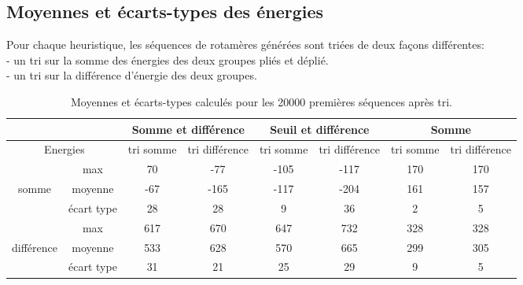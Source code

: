 \documentclass[a4paper,12pt]{article}
\begin{document}
\begin{sffamily}
\section{Moyennes et écarts-types des énergies}



Pour chaque heuristique, les séquences de rotamères générées sont triées de deux façons différentes:\\
- un tri sur la somme des énergies des deux groupes pliés et déplié.\\
- un tri sur la différence d'énergie des deux groupes.
 

    \begin{table}[!htbp]
      \centering
      \resizebox{18cm}{!} {
      \begin{tabular}{|c|c|c|c||c|c||c|c|}
        \hline
        \multicolumn{2}{|c|}{} &\multicolumn{2}{c||}{Somme et différence} & \multicolumn{2}{c||}{Seuil et différence} & \multicolumn{2}{c|}{Somme} \\ \hline

   \multicolumn{2}{|c|}{Energies} & tri somme & tri différence & tri somme & tri différence & tri somme & tri différence  \\ \hline    
              &  max       &  70    &    -77         &   -105   &    -117         &  170       & 170             \\ \cline{2-8}         
   somme      & moyenne    & -67    &    -165        &   -117   &    -204         &  161       & 157             \\ \cline{2-8}      
              & écart type &  28    &    28          &    9     &     36          &   2        &  5              \\ \hline 
              & max        &  617   &    670         &    647   &     732         &   328      & 328             \\ \cline{2-8}         
   différence & moyenne    &  533   &    628         &    570   &     665         &   299      & 305             \\ \cline{2-8}      
              & écart type &  31    &    21          &    25    &     29          &    9       & 5               \\ \cline{2-8} 



        \hline
      \end{tabular}
    }
      \caption{Moyennes et écarts-types calculés pour les 20000 premières séquences après tri.}      

      \label{tab_MCvsHeur}
    \end{table}


  \end{sffamily}
\end{document}
